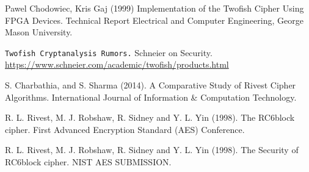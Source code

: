 \begin{thebibliography}{10}
		Pawel Chodowiec, Kris Gaj (1999) Implementation of the Twofish Cipher Using FPGA Devices. Technical Report Electrical and Computer Engineering, George Mason University.
	
		\texttt{Twofish Cryptanalysis Rumors.} Schneier on Security.\\
			\url{https://www.schneier.com/academic/twofish/products.html}

		S. Charbathia, and S. Sharma (2014). A Comparative Study of Rivest Cipher Algorithms. International Journal of Information \& Computation Technology.
	
		R. L. Rivest, M. J. Robshaw, R. Sidney and Y. L. Yin (1998). The RC6\texttrademark \space block cipher. First Advanced Encryption Standard (AES) Conference.

		R. L. Rivest, M. J. Robshaw, R. Sidney and Y. L. Yin (1998). The Security of RC6\texttrademark \space block cipher. NIST AES SUBMISSION.

\end{thebibliography}